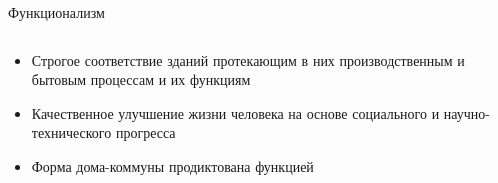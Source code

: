 \begin{frame}{Функционализм}
    \begin{columns}[T,onlytextwidth]
        \begin{column}{0.56\textwidth}
            \begin{itemize}
                \item<1-> Строгое соответствие зданий протекающим в них производственным
                и бытовым процессам и их функциям
                \item<2-> Качественное улучшение жизни человека
                на основе социального и научно-технического прогресса
                \item<3-> Форма дома-коммуны продиктована функцией
            \end{itemize}
        \end{column}
        \begin{column}{0.4\textwidth}
        \end{column}
    \end{columns}
\end{frame}

